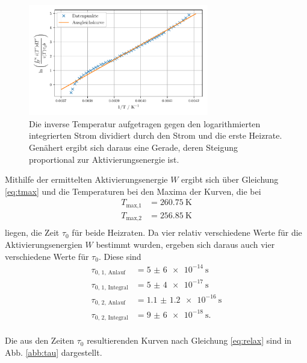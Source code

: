 \begin{figure}
    \centering
    \includegraphics[width=0.7\textwidth]{figures/integral2.pdf}
    \caption{Die inverse Temperatur aufgetragen gegen den logarithmierten integrierten Strom dividiert durch den Strom und die erste Heizrate. Genähert ergibt sich daraus eine Gerade, deren Steigung proportional zur Aktivierungsenergie ist.}
    \label{abb:integral2}
\end{figure}

Mithilfe der ermittelten Aktivierungsenergie $W$ ergibt sich über Gleichung \eqref{eq:tmax} und die Temperaturen bei den Maxima der Kurven, die bei 
\begin{align*}
    T_\text{max,1} &= \SI{260.75}{\kelvin} \\
    T_\text{max,2} &= \SI{256.85}{\kelvin} \\
\end{align*}
liegen, die Zeit $\tau_0$ für beide Heizraten. Da vier relativ verschiedene Werte für die Aktivierungsenergien $W$ bestimmt wurden, ergeben sich daraus auch vier verschiedene Werte für $\tau_0$.
Diese sind 
\begin{align*}
    \tau_\text{0, 1, Anlauf} &= \SI{5(6)e-14}{\second} \\
    \tau_\text{0, 1, Integral} &= \SI{5(4)e-17}{\second} \\
    \tau_\text{0, 2, Anlauf} &= \SI{1.1(12)e-16}{\second} \\
    \tau_\text{0, 2, Integral} &= \SI{9(6)e-18}{\second}. \\
\end{align*}

Die aus den Zeiten $\tau_0$ resultierenden Kurven nach Gleichung \eqref{eq:relax} sind in Abb. \ref{abb:tau} dargestellt.

